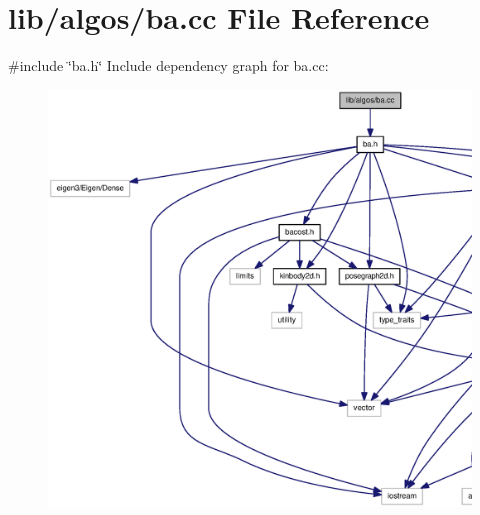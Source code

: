 \section{lib/algos/ba.cc \-File \-Reference}
\label{ba_8cc}
{\ttfamily \#include \char`\"{}ba.\-h\char`\"{}}\*
\-Include dependency graph for ba.\-cc\-:\nopagebreak
\begin{figure}[H]
\begin{center}
\leavevmode
\includegraphics[width=350pt]{ba_8cc__incl}
\end{center}
\end{figure}
